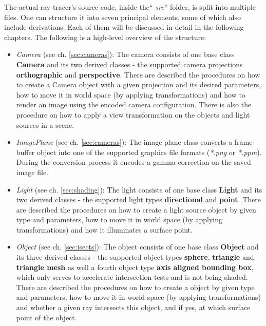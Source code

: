 \documentclass{article}
\begin{document}
\vspace*{\baselineskip}

The actual ray tracer's source code, inside the`` \textit{src}'' folder, is split into multiple files. One can structure it into seven principal elements, some of which also include derivations. Each of them will be discussed in detail in the following chapters. The following is a high-level overview of the structure:
\begin{itemize}
	\itemsep0em 	%
	
	\item \textit{Camera} (see ch. \ref{sec:cameras}): The camera consists of one base class \textbf{Camera} and its two derived classes - the supported camera projections \textbf{orthographic} and \textbf{perspective}. There are described the procedures on how to create a Camera object with a given projection and its desired parameters, how to move it in world space (by applying transformations) and how to render an image using the encoded camera configuration. There is also the procedure on how to apply a view transformation on the objects and light sources in a scene.

	\item \textit{ImagePlane} (see ch. \ref{sec:cameras}): The image plane class converts a frame buffer object into one of the supported graphics file formats (\textit{*.png} or \textit{*.ppm}). During the conversion process it encodes a gamma correction on the saved image file. 
	
	\item \textit{Light} (see ch. \ref{sec:shading}): The light consists of one base class \textbf{Light} and its two derived classes - the supported light types \textbf{directional} and \textbf{point}. There are described the procedures on how to create a light source object by given type and parameters, how to move it in world space (by applying transformations) and how it illuminates a surface point.
	
	\item \textit{Object} (see ch. \ref{sec:isects}): The object consists of one base class \textbf{Object} and its three derived classes - the supported object types \textbf{sphere}, \textbf{triangle} and \textbf{triangle mesh} as well a fourth object type \textbf{axis aligned bounding box}, which only serves to accelerate intersection tests and is not being shaded. There are described the procedures on how to create a object by given type and parameters, how to move it in world space (by applying transformations) and whether a given ray intersects this object, and if yes, at which surface point of the object.
	

\end{itemize}
\end{document}
